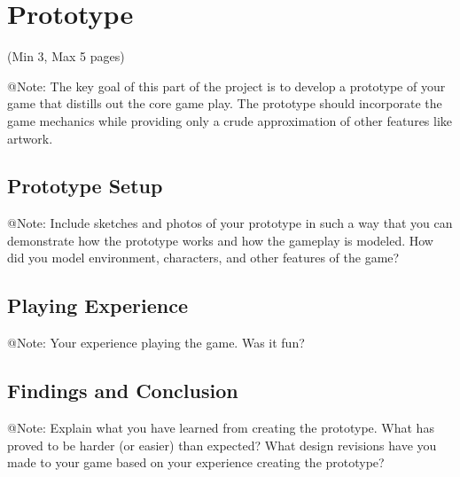 \chapter{Prototype}

\begin{TempText}
	(Min 3, Max 5 pages)
\end{TempText}

\begin{TempText}
	@Note: The key goal of this part of the project is to develop a prototype of your game that distills out the core game play. The prototype should incorporate the game mechanics while providing only a crude approximation of other features like artwork.
\end{TempText}


\section{Prototype Setup}

\begin{TempText}
	@Note: Include sketches and photos of your prototype in such a way that you can demonstrate how the prototype works and how the gameplay is modeled. How did you model environment, characters, and other features of the game?
\end{TempText}


\section{Playing Experience}

\begin{TempText}
	@Note: Your experience playing the game. Was it fun?
\end{TempText}


\section{Findings and Conclusion}

\begin{TempText}
	@Note: Explain what you have learned from creating the prototype. What has proved to be harder (or easier) than expected? What design revisions have you made to your game based on your experience creating the prototype?
\end{TempText}

